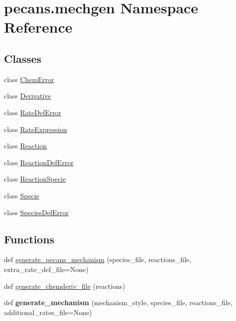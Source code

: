 \hypertarget{namespacepecans_1_1mechgen}{}\section{pecans.\+mechgen Namespace Reference}
\label{namespacepecans_1_1mechgen}
\subsection*{Classes}
\begin{DoxyCompactItemize}
\item 
class \hyperlink{classpecans_1_1mechgen_1_1ChemError}{Chem\+Error}
\item 
class \hyperlink{classpecans_1_1mechgen_1_1Derivative}{Derivative}
\item 
class \hyperlink{classpecans_1_1mechgen_1_1RateDefError}{Rate\+Def\+Error}
\item 
class \hyperlink{classpecans_1_1mechgen_1_1RateExpression}{Rate\+Expression}
\item 
class \hyperlink{classpecans_1_1mechgen_1_1Reaction}{Reaction}
\item 
class \hyperlink{classpecans_1_1mechgen_1_1ReactionDefError}{Reaction\+Def\+Error}
\item 
class \hyperlink{classpecans_1_1mechgen_1_1ReactionSpecie}{Reaction\+Specie}
\item 
class \hyperlink{classpecans_1_1mechgen_1_1Specie}{Specie}
\item 
class \hyperlink{classpecans_1_1mechgen_1_1SpeciesDefError}{Species\+Def\+Error}
\end{DoxyCompactItemize}
\subsection*{Functions}
\begin{DoxyCompactItemize}
\item 
def \hyperlink{namespacepecans_1_1mechgen_a998050ad09f27de979fff1102f144e9b}{generate\+\_\+pecans\+\_\+mechanism} (species\+\_\+file, reactions\+\_\+file, extra\+\_\+rate\+\_\+def\+\_\+file=None)
\item 
def \hyperlink{namespacepecans_1_1mechgen_a537f570f89214d1eb4de4120fab77c99}{generate\+\_\+chemderiv\+\_\+file} (reactions)
\item 
def {\bfseries generate\+\_\+mechanism} (mechanism\+\_\+style, species\+\_\+file, reactions\+\_\+file, additional\+\_\+rates\+\_\+file=None)\hypertarget{namespacepecans_1_1mechgen_a63228ddf741593d74c7c36c253ccdfa4}{}\label{namespacepecans_1_1mechgen_a63228ddf741593d74c7c36c253ccdfa4}

\end{DoxyCompactItemize}
